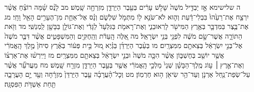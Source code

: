 \documentclass[twoside, openany, parskip=half, 11pt]{book}
\begin{document}
ה שלישימא אָ֣ז יַבְדִּ֤יל מֹשֶׁה֙ שָׁלֹ֣שׁ עָרִ֔ים בְּעֵ֖בֶר הַיַּרְדֵּ֑ן מִזְרְחָ֖ה שָֽׁמֶשׁ׃ מב לָנֻ֨ס שָׁ֜מָּה רוֹצֵ֗חַ אֲשֶׁ֨ר יִרְצַ֤ח אֶת־רֵעֵ֙הוּ֙ בִּבְלִי־דַ֔עַת וְה֛וּא לֹא־שֹׂנֵ֥א ל֖וֹ מִתְּמֹ֣ל שִׁלְשֹׁ֑ם וְנָ֗ס אֶל־אַחַ֛ת מִן־הֶעָרִ֥ים הָאֵ֖ל וָחָֽי׃ מג אֶת־בֶּ֧צֶר בַּמִּדְבָּ֛ר בְּאֶ֥רֶץ הַמִּישֹׁ֖ר לָרֽאוּבֵנִ֑י וְאֶת־רָאמֹ֤ת בַּגִּלְעָד֙ לַגָּדִ֔י וְאֶת־גּוֹלָ֥ן בַּבָּשָׁ֖ן לַֽמְנַשִּֽׁי׃ מד וְזֹ֖את הַתּוֹרָ֑ה אֲשֶׁר־שָׂ֣ם מֹשֶׁ֔ה לִפְנֵ֖י בְּנֵ֥י יִשְׂרָאֵֽל׃ מה אֵ֚לֶּה הָֽעֵדֹ֔ת וְהַֽחֻקִּ֖ים וְהַמִּשְׁפָּטִ֑ים אֲשֶׁ֨ר דִּבֶּ֤ר מֹשֶׁה֙ אֶל־בְּנֵ֣י יִשְׂרָאֵ֔ל בְּצֵאתָ֖ם מִמִּצְרָֽיִם׃ מו בְּעֵ֨בֶר הַיַּרְדֵּ֜ן בַּגַּ֗יְא מ֚וּל בֵּ֣ית פְּע֔וֹר בְּאֶ֗רֶץ סִיחֹן֙ מֶ֣לֶךְ הָֽאֱמֹרִ֔י אֲשֶׁ֥ר יוֹשֵׁ֖ב בְּחֶשְׁבּ֑וֹן אֲשֶׁ֨ר הִכָּ֤ה מֹשֶׁה֙ וּבְנֵ֣י יִשְׂרָאֵ֔ל בְּצֵאתָ֖ם מִמִּצְרָֽיִם׃ מז וַיִּֽירְשׁ֨וּ אֶת־אַרְצ֜וֹ וְאֶת־אֶ֣רֶץ ׀ ע֣וֹג מֶֽלֶךְ־הַבָּשָׁ֗ן שְׁנֵי֙ מַלְכֵ֣י הָֽאֱמֹרִ֔י אֲשֶׁ֖ר בְּעֵ֣בֶר הַיַּרְדֵּ֑ן מִזְרַ֖ח שָֽׁמֶשׁ׃ מח מֵעֲרֹעֵ֞ר אֲשֶׁ֨ר עַל־שְׂפַת־נַ֧חַל אַרְנֹ֛ן וְעַד־הַ֥ר שִׂיאֹ֖ן ה֥וּא חֶרְמֽוֹן׃ מט וְכׇל־הָ֨עֲרָבָ֜ה עֵ֤בֶר הַיַּרְדֵּן֙ מִזְרָ֔חָה וְעַ֖ד יָ֣ם הָעֲרָבָ֑ה תַּ֖חַת אַשְׁדֹּ֥ת הַפִּסְגָּֽה׃
\end{document}

